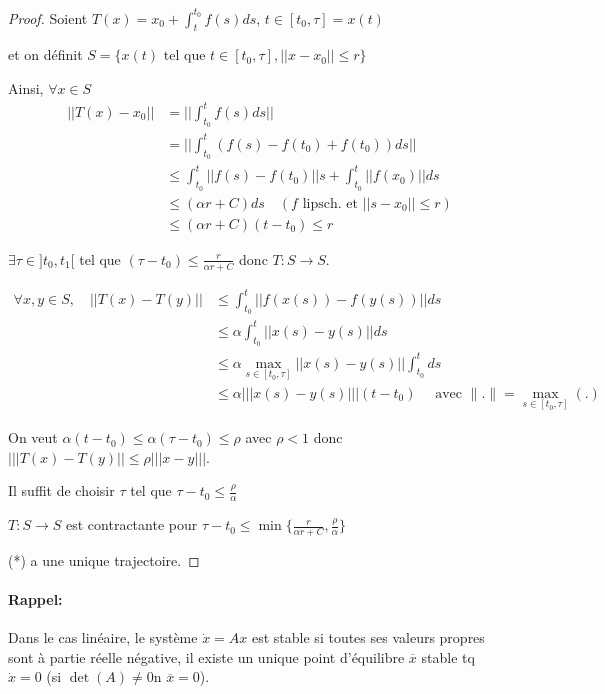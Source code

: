 \documentclass[main.tex]{subfiles}
\begin{document}
\begin{proof}
Soient $T(x) = x_0 + \int_t^{t_0}f(s)ds$, $t\in[t_0,\tau] = x(t)$

et on définit $S = \{ x(t) \text{ tel que } t\in [t_0,\tau], ||x-x_0|| \leq r \}$

Ainsi, $\forall x \in S$
\begin{align*}
||T(x) - x_0|| & = ||\int_{t_0}^t f(s)ds || \\
& = || \int_{t_0}^t (f(s)-f(t_0)+f(t_0))ds || \\
& \leq \int_{t_0}^t ||f(s)-f(t_0)||s + \int_{t_0}^t ||f(x_0)||ds \\
& \leq (\alpha r + C) ds \quad (f \text{ lipsch. et } ||s-x_0|| \leq r) \\
& \leq (\alpha r + C)(t-t_0) \leq r
\end{align*}

$\exists \tau \in ]t_0,t_1[$ tel que $(\tau - t_0) \leq \frac{r}{\alpha r + C}$ donc $T:S\rightarrow S$.

\begin{align*}
\forall x,y \in S, \quad ||T(x)-T(y)|| & \leq \int_{t_0}^t || f(x(s))-f(y(s)) || ds \\
& \leq \alpha \int_{t_0}^t || x(s) - y(s) || ds \\
& \leq \alpha \max_{s\in [t_0,\tau]} ||x(s)-y(s)|| \int_{t_0}^t ds \\
& \leq \alpha |||x(s)-y(s)||| (t-t_0) \quad \text{ avec } \|.\|=\max_{s\in [t_0,\tau]}(.)
\end{align*}

On veut $\alpha (t-t_0) \leq \alpha (\tau - t_0) \leq \rho$ avec $\rho<1$ donc $|||T(x)-T(y)|| \leq \rho |||x-y|||$.

Il suffit de choisir $\tau$ tel que $\tau - t_0 \leq \frac{\rho}{\alpha}$

$T:S \rightarrow S$ est contractante pour $\tau - t_0 \leq \min \{ \frac{r}{\alpha r + C}, \frac{\rho}{\alpha} \}$

(*) a une unique trajectoire.
\end{proof}

\paragraph{Rappel:}
Dans le cas linéaire, le système $\dot{x} =A x $ est stable si toutes ses valeurs propres sont à partie réelle négative, il existe un unique point d'équilibre $\overline{x}$ stable tq  $\dot{x} =0$ (si $\det(A) \neq 0$n $\overline{x}=0$).
\end{document}
